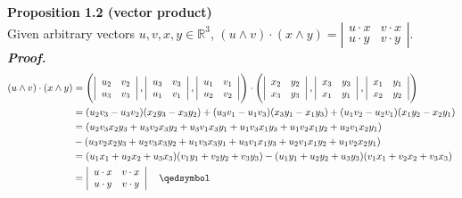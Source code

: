 \documentclass{article}
\begin{document}
\par
\textbf{Proposition 1.2 (vector product)}\\
Given arbitrary vectors $u, v, x, y \in \mathbb{R}^3$,
$(u \wedge v) \cdot (x \wedge y) = 
\left|\begin{array}{cc} 
    u \cdot x & v \cdot x \\ 
    u \cdot y & v \cdot y
\end{array}\right|$.\\
\textbf{\textit{Proof.}}\\
$$
\begin{aligned}
    (u \wedge v) \cdot (x \wedge y) &= 
    \Biggl(
    \left|\begin{array}{cc} 
        u_2 & v_2 \\ 
        u_3 & v_3
    \end{array}\right|,
    \left|\begin{array}{cc} 
        u_3 & v_3 \\ 
        u_1 & v_1
    \end{array}\right|,
    \left|\begin{array}{cc} 
        u_1 & v_1 \\ 
        u_2 & v_2
    \end{array}\right|
    \Biggr)
    \cdot
    \Biggl(
    \left|\begin{array}{cc} 
        x_2 & y_2 \\ 
        x_3 & y_3
    \end{array}\right|,
    \left|\begin{array}{cc} 
        x_3 & y_3 \\ 
        x_1 & y_1
    \end{array}\right|,
    \left|\begin{array}{cc} 
        x_1 & y_1 \\ 
        x_2 & y_2
    \end{array}\right|
    \Biggr)\\
    &=
    (u_2v_3-u_3v_2)(x_2y_3-x_3y_2) +
    (u_3v_1-u_1v_3)(x_3y_1-x_1y_3) +
    (u_1v_2-u_2v_1)(x_1y_2-x_2y_1)\\
    &=
    (u_2v_3x_2y_3 + u_3v_2x_3y_2 + u_3v_1x_3y_1 + u_1v_3x_1y_3 + u_1v_2x_1y_2 + u_2v_1x_2y_1)\\
    &-(u_3v_2x_2y_3 + u_2v_3x_3y_2 + u_1v_3x_3y_1 + u_3v_1x_1y_3 + u_2v_1x_1y_2 + u_1v_2x_2y_1)\\
    &= 
    (u_1x_1 + u_2x_2 + u_3x_3)(v_1y_1 + v_2y_2 + v_3y_3)-(u_1y_1 + u_2y_2 + u_3y_3)(v_1x_1 + v_2x_2 + v_3x_3)\\
    &=
    \left|\begin{array}{cc} 
        u \cdot x & v \cdot x \\ 
        u \cdot y & v \cdot y
    \end{array}\right| \quad \qedsymbol\\
\end{aligned}
$$
\end{document}
